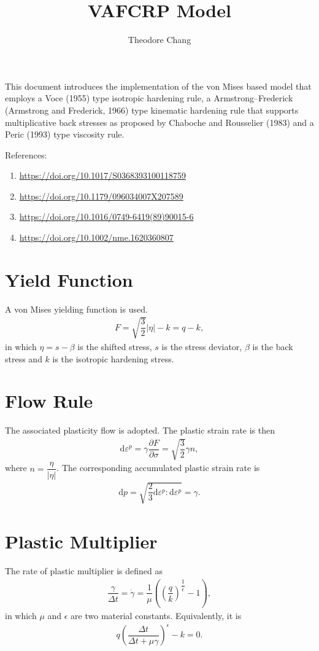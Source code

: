 \documentclass[a4paper,10pt,fleqn]{article}
\title{VAFCRP Model}
\author{Theodore Chang}
\date{}\pagestyle{empty}
\newcommand*{\md}[1]{\mathrm{d}#1}
\newcommand*{\pfrac}[2]{\dfrac{\partial#1}{\partial#2}}
\begin{document}
\noindent{}This document introduces the implementation of the von Mises based model that employs a Voce (1955) type isotropic hardening rule, a Armstrong--Frederick (Armstrong and Frederick, 1966) type kinematic hardening rule that supports multiplicative back stresses as proposed by Chaboche and Rousselier (1983) and a Peric (1993) type viscosity rule.

\noindent{}References:
\begin{enumerate}
\item \href{https://doi.org/10.1017/S0368393100118759}{https://doi.org/10.1017/S0368393100118759}
\item \href{https://doi.org/10.1179/096034007X207589}{https://doi.org/10.1179/096034007X207589}
\item \href{https://doi.org/10.1016/0749-6419(89)90015-6}{https://doi.org/10.1016/0749-6419(89)90015-6}
\item \href{https://doi.org/10.1002/nme.1620360807}{https://doi.org/10.1002/nme.1620360807}
\end{enumerate}
\section{Yield Function}
A von Mises yielding function is used.
\begin{gather}
F=\sqrt{\dfrac{3}{2}}\Big|\eta\Big|-k=q-k,
\end{gather}
in which $\eta=s-\beta$ is the shifted stress, $s$ is the stress deviator, $\beta$ is the back stress and $k$ is the isotropic hardening stress.
\section{Flow Rule}
The associated plasticity flow is adopted. The plastic strain rate is then
\begin{gather}
\md{\varepsilon^p}=\gamma\pfrac{F}{\sigma}=\sqrt{\dfrac{3}{2}}\gamma{}n,
\end{gather}
where $n=\dfrac{\eta}{\Big|\eta\Big|}$. The corresponding accumulated plastic strain rate is
\begin{gather}
\md{p}=\sqrt{\dfrac{2}{3}\md{\varepsilon^p}:\md{\varepsilon^p}}=\gamma.
\end{gather}
\section{Plastic Multiplier}
The rate of plastic multiplier is defined as
\begin{gather}
\dfrac{\gamma}{\Delta{}t}=\dot{\gamma}=\dfrac{1}{\mu}\left(\left(\dfrac{q}{k}\right)^{\dfrac{1}{\epsilon}}-1\right),
\end{gather}
in which $\mu$ and $\epsilon$ are two material constants. Equivalently, it is
\begin{gather}
q\left(\dfrac{\Delta{}t}{\Delta{}t+\mu\gamma}\right)^\epsilon-k=0.
\end{gather}
\end{document}
